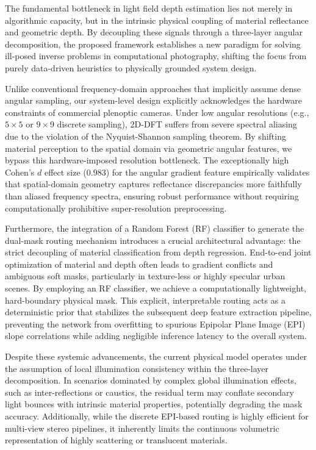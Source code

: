 \documentclass[lettersize,journal]{IEEEtran}
\begin{document}
The fundamental bottleneck in light field depth estimation lies not merely in algorithmic capacity, but in the intrinsic physical coupling of material reflectance and geometric depth. By decoupling these signals through a three-layer angular decomposition, the proposed framework establishes a new paradigm for solving ill-posed inverse problems in computational photography, shifting the focus from purely data-driven heuristics to physically grounded system design.

Unlike conventional frequency-domain approaches that implicitly assume dense angular sampling, our system-level design explicitly acknowledges the hardware constraints of commercial plenoptic cameras. Under low angular resolutions (e.g., $5 \times 5$ or $9 \times 9$ discrete sampling), 2D-DFT suffers from severe spectral aliasing due to the violation of the Nyquist-Shannon sampling theorem. By shifting material perception to the spatial domain via geometric angular features, we bypass this hardware-imposed resolution bottleneck. The exceptionally high Cohen's $d$ effect size ($0.983$) for the angular gradient feature empirically validates that spatial-domain geometry captures reflectance discrepancies more faithfully than aliased frequency spectra, ensuring robust performance without requiring computationally prohibitive super-resolution preprocessing.

Furthermore, the integration of a Random Forest (RF) classifier to generate the dual-mask routing mechanism introduces a crucial architectural advantage: the strict decoupling of material classification from depth regression. End-to-end joint optimization of material and depth often leads to gradient conflicts and ambiguous soft masks, particularly in texture-less or highly specular urban scenes. By employing an RF classifier, we achieve a computationally lightweight, hard-boundary physical mask. This explicit, interpretable routing acts as a deterministic prior that stabilizes the subsequent deep feature extraction pipeline, preventing the network from overfitting to spurious Epipolar Plane Image (EPI) slope correlations while adding negligible inference latency to the overall system.

Despite these systemic advancements, the current physical model operates under the assumption of local illumination consistency within the three-layer decomposition. In scenarios dominated by complex global illumination effects, such as inter-reflections or caustics, the residual term may conflate secondary light bounces with intrinsic material properties, potentially degrading the mask accuracy. Additionally, while the discrete EPI-based routing is highly efficient for multi-view stereo pipelines, it inherently limits the continuous volumetric representation of highly scattering or translucent materials.
\end{document}
